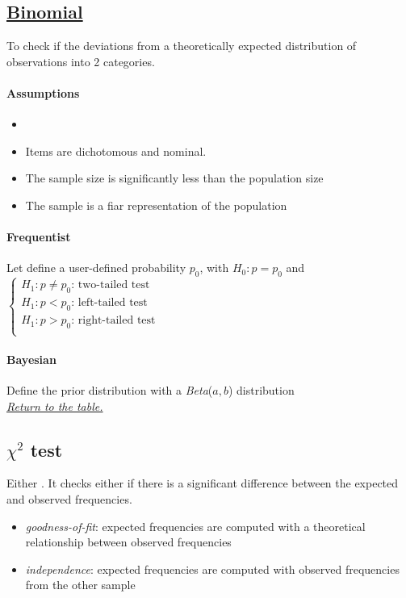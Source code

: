 \subsection{\hyperref[binomial_test]{Binomial}}
To check if the deviations from a theoretically expected distribution of observations into
2 categories.\\

\paragraph{Assumptions}
\begin{itemize}
    \item {}
    \item Items are dichotomous and nominal.
    \item The sample size is significantly less than the population size
    \item The sample is a fiar representation of the population
\end{itemize}


\paragraph{Frequentist}
Let define a user-defined probability $p_{0}$, with $H_{0}: p = p_{0}$ and
$\begin{cases}
    H_{1}: p \neq p_{0}\text{: two-tailed test} \\
    H_{1}: p < p_{0}\text{: left-tailed test} \\
    H_{1}: p > p_{0}\text{: right-tailed test} \\
     
\end{cases}$

\paragraph{Bayesian}
Define the prior distribution with a \emph{Beta}($a,b$) distribution\\

\textit{\hyperref[statistical_method_table]{Return to the table.}}


\subsection{$\chi^{2}$ test}
Either .
It checks either if there is a significant difference between the expected and observed 
frequencies.
\begin{itemize}
    \item \emph{goodness-of-fit}: expected frequencies are computed with a theoretical 
        relationship between observed frequencies
    \item \emph{independence}: expected frequencies are computed with observed frequencies
        from the other sample
\end{itemize}
